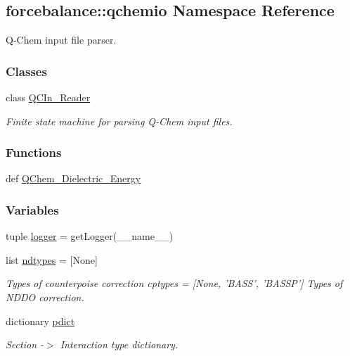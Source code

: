 \hypertarget{namespaceforcebalance_1_1qchemio}{\subsection{forcebalance\-:\-:qchemio \-Namespace \-Reference}
\label{namespaceforcebalance_1_1qchemio}
}


\-Q-\/\-Chem input file parser.  


\subsubsection*{\-Classes}
\begin{DoxyCompactItemize}
\item 
class \hyperlink{classforcebalance_1_1qchemio_1_1QCIn__Reader}{\-Q\-C\-In\-\_\-\-Reader}
\begin{DoxyCompactList}\small\item\em \-Finite state machine for parsing \-Q-\/\-Chem input files. \end{DoxyCompactList}\end{DoxyCompactItemize}
\subsubsection*{\-Functions}
\begin{DoxyCompactItemize}
\item 
def \hyperlink{namespaceforcebalance_1_1qchemio_a067c1b4f6695fc5dc20b5de66114bb7f}{\-Q\-Chem\-\_\-\-Dielectric\-\_\-\-Energy}
\end{DoxyCompactItemize}
\subsubsection*{\-Variables}
\begin{DoxyCompactItemize}
\item 
tuple \hyperlink{namespaceforcebalance_1_1qchemio_afd2772ef637812910014df1aae85b9ec}{logger} = get\-Logger(\-\_\-\-\_\-name\-\_\-\-\_\-)
\item 
list \hyperlink{namespaceforcebalance_1_1qchemio_a18a590388e19839ca2e5c1e14d6062ba}{ndtypes} = \mbox{[}\-None\mbox{]}
\begin{DoxyCompactList}\small\item\em \-Types of counterpoise correction cptypes = \mbox{[}\-None, '\-B\-A\-S\-S', '\-B\-A\-S\-S\-P'\mbox{]} \-Types of \-N\-D\-D\-O correction. \end{DoxyCompactList}\item 
dictionary \hyperlink{namespaceforcebalance_1_1qchemio_aa37b6283447914c5c75e76c8475e201e}{pdict}
\begin{DoxyCompactList}\small\item\em \-Section -\/$>$ \-Interaction type dictionary. \end{DoxyCompactList}\end{DoxyCompactItemize}


